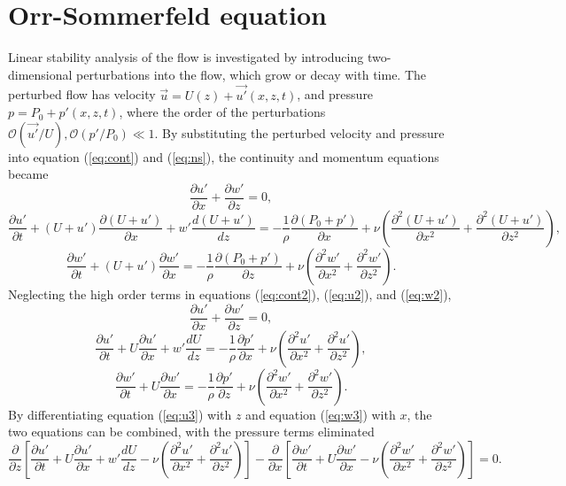 \section{Orr-Sommerfeld equation}
Linear stability analysis of the flow is investigated by introducing two-dimensional perturbations into the flow, which grow or decay with time. The perturbed flow has velocity $\vec{u}=U({z})+\vec{u'}({x},{z},{t})$, and pressure $p=P_0+p'({x},{z},{t})$, where the order of the perturbations $\mathcal{O}(\vec{u'}/{U}), \mathcal{O}(p'/P_0)\ll 1$. By substituting the perturbed velocity and pressure into equation (\ref{eq:cont}) and (\ref{eq:ns}), the continuity and momentum equations became
\begin{equation}
    \frac{\partial{u}'}{\partial{x}}+\frac{\partial{w}'}{\partial{z}}=0,
    \label{eq:cont2}
\end{equation}
\begin{equation}
    \frac{\partial{u}'}{\partial{t}}+{(U+u')}\frac{\partial (U+u')}{\partial{x}}+{w}'\frac{d(U+u')}{d{z}}=-\frac{1}{\rho}\frac{\partial(P_0+p')}{\partial{x}}+\nu\left(\frac{\partial^2(U+u')}{\partial{x}^2}+\frac{\partial^2(U+u')}{\partial{z}^2}\right),
    \label{eq:u2}
\end{equation}
\begin{equation}
    \frac{\partial{w}'}{\partial{t}}+(U+u')\frac{\partial{w}'}{\partial{x}}=-\frac{1}{\rho}\frac{\partial(P_0+p')}{\partial{z}}+\nu\left(\frac{\partial^2{w}'}{\partial{x}^2}+\frac{\partial^2{w}'}{\partial{z}^2}\right).
    \label{eq:w2}
\end{equation}
Neglecting the high order terms in equations (\ref{eq:cont2}), (\ref{eq:u2}), and (\ref{eq:w2}),
\begin{equation}
    \frac{\partial{u}'}{\partial{x}}+\frac{\partial{w}'}{\partial{z}}=0,
    \label{eq:cont3}
\end{equation}
\begin{equation}
    \frac{\partial{u}'}{\partial{t}}+{U}\frac{\partial u'}{\partial{x}}+{w}'\frac{d{U}}{d{z}}=-\frac{1}{\rho}\frac{\partial{p}'}{\partial{x}}+\nu\left(\frac{\partial^2{u}'}{\partial{x}^2}+\frac{\partial^2{u}'}{\partial{z}^2}\right),
    \label{eq:u3}
\end{equation}
\begin{equation}
    \frac{\partial{w}'}{\partial{t}}+U\frac{\partial{w}'}{\partial{x}}=-\frac{1}{\rho}\frac{\partial{p}'}{\partial{z}}+\nu\left(\frac{\partial^2{w}'}{\partial{x}^2}+\frac{\partial^2{w}'}{\partial{z}^2}\right).
    \label{eq:w3}
\end{equation}
By differentiating equation (\ref{eq:u3}) with $z$ and equation (\ref{eq:w3}) with $x$, the two equations can be combined, with the pressure terms eliminated
 \begin{equation}
     \frac{\partial}{\partial z}\left[\frac{\partial{u}'}{\partial{t}}+{U}\frac{\partial u'}{\partial{x}}+{w}'\frac{d{U}}{d{z}}-\nu\left(\frac{\partial^2{u}'}{\partial{x}^2}+\frac{\partial^2{u}'}{\partial{z}^2}\right)\right]
     -\frac{\partial}{\partial x}\left[\frac{\partial{w}'}{\partial{t}}+U\frac{\partial{w}'}{\partial{x}}-\nu\left(\frac{\partial^2{w}'}{\partial{x}^2}+\frac{\partial^2{w}'}{\partial{z}^2}\right)\right]=0.
     \label{eq:uw1}
 \end{equation}
 
